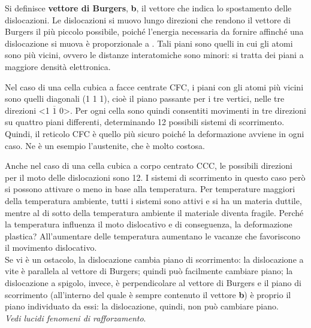 Si definisce \textbf{vettore di Burgers}, \textbf{b}, il vettore che indica lo spostamento delle dislocazioni. Le dislocazioni si muovo lungo direzioni che rendono il vettore di Burgers il più piccolo possibile, poiché l’energia necessaria da fornire affinché una dislocazione si muova è proporzionale a . Tali piani sono quelli in cui gli atomi sono più vicini, ovvero le distanze interatomiche sono minori: si tratta dei piani a maggiore densità elettronica.

Nel caso di una cella cubica a facce centrate CFC, i piani con gli atomi più vicini sono quelli diagonali (1 1 1), cioè il piano passante per i tre vertici, nelle tre direzioni <1 $\overline{1}$ 0>. Per ogni cella sono quindi consentiti movimenti in tre direzioni su quattro piani differenti, determinando 12 possibili sistemi di scorrimento.\\
Quindi, il reticolo CFC è quello più sicuro poiché la deformazione avviene in ogni caso. Ne è un esempio l’austenite, che è molto costosa.

Anche nel caso di una cella cubica a corpo centrato CCC, le possibili direzioni per il moto delle dislocazioni sono 12. I sistemi di scorrimento in questo caso però si possono attivare o meno in base alla temperatura. Per temperature maggiori della temperatura ambiente, tutti i sistemi sono attivi e si ha un materia duttile, mentre al di sotto della temperatura ambiente il materiale diventa fragile. Perché la temperatura influenza il moto dislocativo e di conseguenza, la deformazione plastica? All’aumentare delle temperatura aumentano le vacanze che favoriscono il movimento dislocativo.\\
Se vi è un ostacolo, la dislocazione cambia piano di scorrimento: la dislocazione a vite è parallela al vettore di Burgers; quindi può facilmente cambiare piano; la dislocazione a spigolo, invece, è perpendicolare al vettore di Burgers e il piano di scorrimento (all’interno del quale è sempre contenuto il vettore \textbf{b}) è proprio il piano individuato da essi: la dislocazione, quindi, non può cambiare piano.\\
 \textit{Vedi lucidi fenomeni di rafforzamento}.

